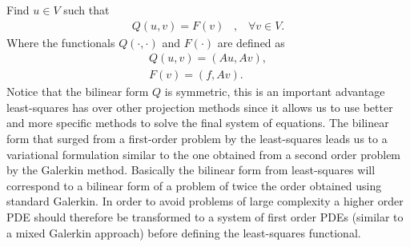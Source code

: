 Find $u \in V$ such that 
\begin{align}
	Q(u,v) = F(v) \; \; \; , \; \; \; \forall v \in V.
	\label{def:varForm}
\end{align}
Where the functionals $Q(\cdot,\cdot)$ and $F(\cdot)$ are defined as
\begin{align}
	Q(u,v) = (Au,Av), \\
	F(v) = (f,Av).
	\label{def:bilin}
\end{align}
Notice that the bilinear form $Q$ is symmetric, this is an important advantage least-squares has over other projection methods since it allows us to use better and more specific methods to solve the final system of equations. The bilinear form that surged from a first-order problem by the least-squares leads us to a variational formulation similar to the one obtained from a second order problem by the Galerkin method. Basically the bilinear form from least-squares will correspond to a bilinear form of a problem of twice the order obtained using standard Galerkin. In order to avoid problems of large complexity a higher order PDE should therefore be transformed to a system of first order PDEs (similar to a mixed Galerkin approach) before defining the least-squares functional.


